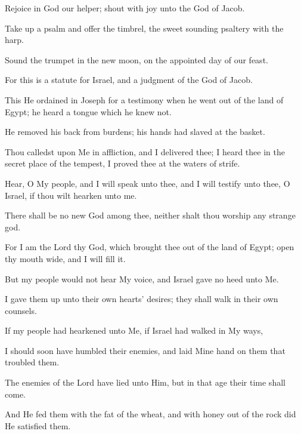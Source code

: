 Rejoice in God our helper; shout with joy unto the God of Jacob.

Take up a psalm and offer the timbrel, the sweet sounding psaltery with the harp.

Sound the trumpet in the new moon, on the appointed day of our feast.

For this is a statute for Israel, and a judgment of the God of Jacob.

This He ordained in Joseph for a testimony when he went out of the land of Egypt; he heard a tongue which he knew not.

He removed his back from burdens; his hands had slaved at the basket.

Thou calledst upon Me in affliction, and I delivered thee; I heard thee in the secret place of the tempest, I proved thee at the waters of strife.

Hear, O My people, and I will speak unto thee, and I will testify unto thee, O Israel, if thou wilt hearken unto me.

There shall be no new God among thee, neither shalt thou worship any strange god.

For I am the Lord thy God, which brought thee out of the land of Egypt; open thy mouth wide, and I will fill it.

But my people would not hear My voice, and Israel gave no heed unto Me.

I gave them up unto their own hearts' desires; they shall walk in their own counsels.

If my people had hearkened unto Me, if Israel had walked in My ways,

I should soon have humbled their enemies, and laid Mine hand on them that troubled them.

The enemies of the Lord have lied unto Him, but in that age their time shall come.

And He fed them with the fat of the wheat, and with honey out of the rock did He satisfied them.
